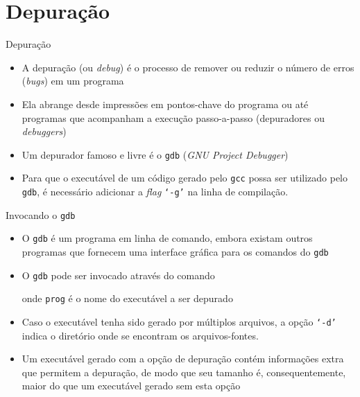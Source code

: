\section{Depuração}

\begin{frame}[fragile]{Depuração}

	\begin{itemize}
		\item A depuração (ou \textit{debug}) é o processo de remover ou reduzir o número de 
		erros (\textit{bugs}) em um programa

		\item Ela abrange desde impressões em pontos-chave do programa ou até programas que 
        acompanham a execução passo-a-passo (depuradores ou \textit{debuggers})

		\item Um depurador famoso e livre é o \texttt{gdb} (\textit{GNU Project Debugger})
		
		\item Para que o executável de um código gerado pelo \texttt{gcc} possa ser utilizado pelo 
        \texttt{gdb}, é necessário adicionar a \textit{flag} \texttt{\lq -g\rq} na 
		linha de compilação.
		
    \end{itemize}
\end{frame}

\begin{frame}[fragile]{Invocando o \texttt{gdb}}

	\begin{itemize}
        \item O \texttt{gdb} é um programa em linha de comando, embora existam outros programas
        que fornecem uma interface gráfica para os comandos do \texttt{gdb} 

		\item O \texttt{gdb} pode ser invocado através do comando
		onde \texttt{prog} é o nome do executável a ser depurado

		\item Caso o executável tenha sido gerado por múltiplos arquivos, a opção 
        \texttt{\lq -d\rq} indica o diretório onde se encontram os arquivos-fontes.

        \item Um executável gerado com a opção de depuração contém informações extra que 
        permitem a depuração, de modo que seu tamanho é, consequentemente, maior do que 
        um executável gerado sem esta opção
	\end{itemize}

\end{frame}

